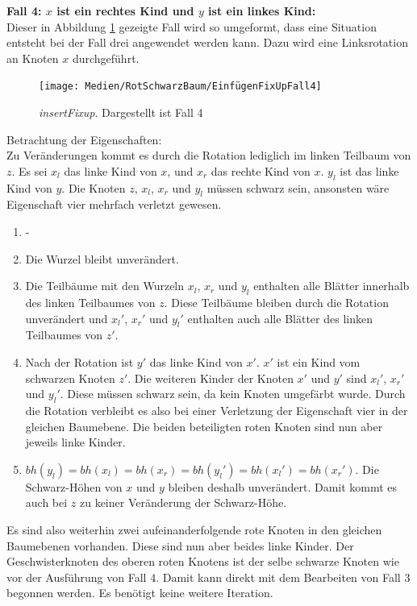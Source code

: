 \documentclass[a4paper,12pt]{article}
\begin{document}
\noindent\textbf{Fall 4: $x$ ist ein rechtes Kind und $y$ ist ein linkes Kind: }\\      
Dieser in Abbildung \ref{fig:EinfügenFixUpFall4} gezeigte Fall wird so umgeformt, dass eine Situation entsteht bei der Fall drei angewendet werden kann. Dazu wird eine Linksrotation an Knoten $x$ durchgeführt.\\
\begin{figure}[H]
	\centering
	\texttt{[image: Medien/RotSchwarzBaum/EinfügenFixUpFall4]}
	\caption{\textit{insertFixup}. Dargestellt ist Fall 4  }
	\label{fig:EinfügenFixUpFall4}
\end{figure}
\noindent Betrachtung der Eigenschaften:\\
Zu Veränderungen kommt es durch die Rotation lediglich im linken Teilbaum von $z$. Es sei $x_l$ das linke Kind von $x$,  und $x_r$ das rechte Kind von $x$. $y_l$ ist das linke Kind von $y$. Die Knoten $z$, $x_l$, $x_r$ und $y_l$ müssen schwarz sein, ansonsten wäre Eigenschaft vier mehrfach verletzt gewesen.
\begin{enumerate}
	\item -
	\item Die Wurzel bleibt unverändert.
	\item  Die Teilbäume mit den Wurzeln $x_l$, $x_r$ und $y_l$ enthalten alle Blätter innerhalb des linken Teilbaumes von $z$. Diese Teilbäume bleiben durch die Rotation unverändert und ${x_l}'$, ${x_r}'$ und ${y_l}'$ enthalten auch alle Blätter des linken Teilbaumes von $z'$.
	\item Nach der Rotation ist $y'$ das linke Kind von $x'$. $x'$ ist ein Kind vom schwarzen Knoten $z'$. Die weiteren Kinder der Knoten $x'$ und $y'$ sind ${x_l}'$, ${x_r}'$ und ${y_l}'$. Diese müssen schwarz sein, da kein Knoten umgefärbt wurde. Durch die Rotation verbleibt es also bei einer Verletzung der Eigenschaft vier in der gleichen Baumebene. Die beiden beteiligten roten Knoten sind nun aber jeweils linke Kinder.   
	\item $ \mathit{bh(y_l)} = \mathit{bh(x_l)} = \mathit{bh(x_r)} = \mathit{bh({y_l}')} = \mathit{bh({x_l}')} = \mathit{bh({x_r}')} $. Die Schwarz-Höhen von $x$ und $y$ bleiben deshalb unverändert. Damit kommt es auch bei $z$ zu keiner Veränderung der Schwarz-Höhe. 
\end{enumerate}  

\noindent Es sind also weiterhin zwei aufeinanderfolgende rote Knoten in den gleichen Baumebenen vorhanden. Diese sind nun aber beides linke Kinder. Der Geschwisterknoten des oberen roten Knotens ist der selbe schwarze Knoten wie vor der Ausführung von Fall 4. Damit kann direkt mit dem Bearbeiten von Fall 3 begonnen werden. Es benötigt keine weitere Iteration.\\
\end{document}

